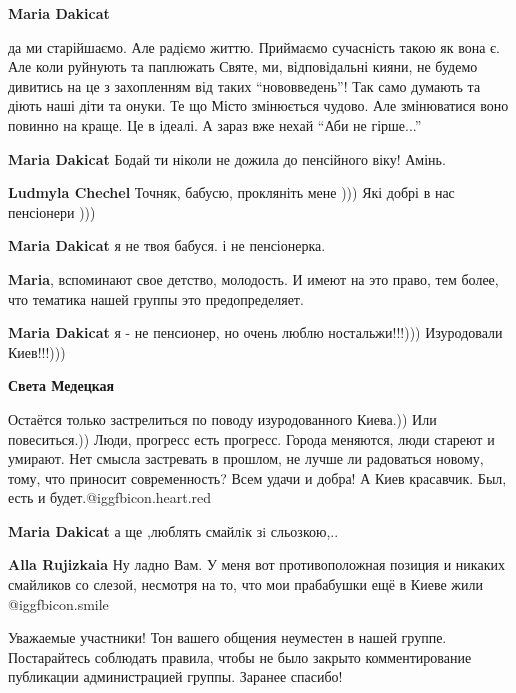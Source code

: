 \begin{itemize}
\begin{itemize}
\begin{itemize}
\textbf{Maria Dakicat} 

да ми старійшаємо. Але радіємо життю. Приймаємо сучасність такою як вона є. Але
коли руйнують та паплюжать Святе, ми, відповідальні кияни, не будемо дивитись
на це з захопленням від таких \enquote{нововведень}! Так само думають та діють наші
діти та онуки. Те що Місто змінюється чудово. Але змінюватися воно повинно на
краще. Це в ідеалі. А зараз вже нехай \enquote{Аби не гірше...}


\textbf{Maria Dakicat} Бодай ти ніколи не дожила до пенсійного віку! Амінь.

\textbf{Ludmyla Chechel} Точняк, бабусю, прокляніть мене ))) Які добрі в нас пенсіонери )))

\textbf{Maria Dakicat} я не твоя бабуся. і не пенсіонерка.

\end{itemize} %

\textbf{Maria}, вспоминают свое детство, молодость. И имеют на это право, тем более, что тематика нашей группы это предопределяет.

\textbf{Maria Dakicat} я - не пенсионер, но очень люблю ностальжи!!!))) Изуродовали Киев!!!)))

\begin{itemize} %
\textbf{Света Медецкая} 

Остаётся только застрелиться по поводу изуродованного Киева.)) Или
повеситься.)) Люди, прогресс есть прогресс. Города меняются, люди стареют и
умирают. Нет смысла застревать в прошлом, не лучше ли радоваться новому,
тому, что приносит современность? Всем удачи и добра! А Киев красавчик. Был,
есть и будет.@igg{fbicon.heart.red}

\end{itemize} %

\textbf{Maria Dakicat} а ще ,люблять смайлiк зi сльозкою,..

\textbf{Alla Rujizkaia} Ну ладно Вам. У меня вот противоположная позиция и никаких смайликов со слезой, несмотря на то, что мои прабабушки ещё в Киеве жили  @igg{fbicon.smile} 


Уважаемые участники! Тон вашего общения неуместен в нашей группе. Постарайтесь
соблюдать правила, чтобы не было закрыто комментирование публикации
администрацией группы. Заранее спасибо!


\end{itemize}
\end{itemize}
